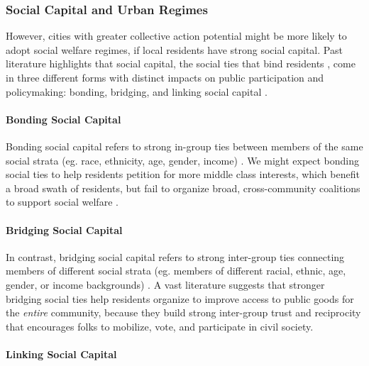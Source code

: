 \documentclass[preprint, 3p,
authoryear]{elsarticle} %
\begin{document}
\hypertarget{social-capital-and-urban-regimes}{%
\subsubsection{Social Capital and Urban
Regimes}\label{social-capital-and-urban-regimes}}

However, cities with greater collective action potential might be more
likely to adopt social welfare regimes, if local residents have strong
social capital. Past literature highlights that social capital, the
social ties that bind residents \citep{putnam_2000, woolcock_2010}, come
in three different forms with distinct impacts on public participation
and policymaking: bonding, bridging, and linking social capital
\citep{aldrich_and_meyer_2015}.

\hypertarget{bonding-social-capital}{%
\paragraph{Bonding Social Capital}\label{bonding-social-capital}}

Bonding social capital refers to strong in-group ties between members of
the same social strata (eg. race, ethnicity, age, gender, income)
\citep{mcpherson_et_al_2001, mouw_2006}. We might expect bonding social
ties to help residents petition for more middle class interests, which
benefit a broad swath of residents, but fail to organize broad,
cross-community coalitions to support social welfare
\citep{tsai_2007, cox_2011, alcorta_et_al_2020}.

\hypertarget{bridging-social-capital}{%
\paragraph{Bridging Social Capital}\label{bridging-social-capital}}

In contrast, bridging social capital refers to strong inter-group ties
connecting members of different social strata (eg. members of different
racial, ethnic, age, gender, or income backgrounds)
\citep{putnam_2000, aldrich_2019}. A vast literature suggests that
stronger bridging social ties help residents organize to improve access
to public goods for the \emph{entire} community, because they build
strong inter-group trust and reciprocity that encourages folks to
mobilize, vote, and participate in civil society.

\hypertarget{linking-social-capital}{%
\paragraph{Linking Social Capital}\label{linking-social-capital}}
\end{document}
